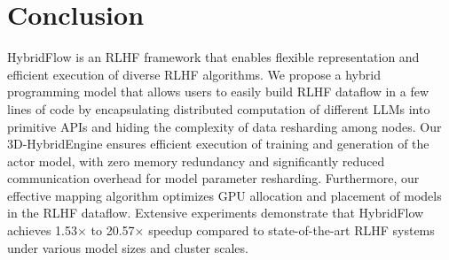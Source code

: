 \vspace{-1mm}
\section{Conclusion}

HybridFlow is an RLHF framework that enables flexible representation and efficient execution of diverse RLHF algorithms. 
We propose a hybrid programming model that allows users to easily build RLHF dataflow in a few lines of code by encapsulating distributed computation of different LLMs into primitive APIs and hiding the complexity of data resharding among nodes. Our 3D-HybridEngine ensures efficient execution of training and generation of the actor model, with zero memory redundancy and significantly reduced communication overhead for model parameter resharding. Furthermore, our effective mapping algorithm optimizes GPU allocation and placement of models in the RLHF dataflow.
Extensive experiments demonstrate that HybridFlow achieves 1.53$\times$ to 20.57$\times$ speedup compared to state-of-the-art RLHF systems under various model sizes and cluster scales.


